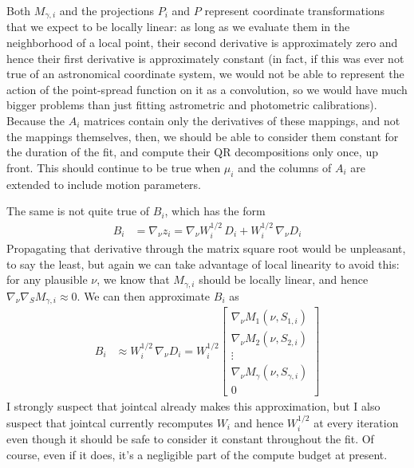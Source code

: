 Both $M_{\gamma,i}$ and the projections $P_i$ and $P$ represent coordinate transformations that we expect to be locally linear: as long as we evaluate them in the neighborhood of a local point, their second derivative is approximately zero and hence their first derivative is approximately constant (in fact, if this was ever not true of an astronomical coordinate system, we would not be able to represent the action of the point-spread function on it as a convolution, so we would have much bigger problems than just fitting astrometric and photometric calibrations).
Because the $A_i$ matrices contain only the derivatives of these mappings, and not the mappings themselves, then, we should be able to consider them constant for the duration of the fit, and compute their QR decompositions only once, up front.
This should continue to be true when $\mu_i$ and the columns of $A_i$ are extended to include motion parameters.

The same is not quite true of $B_i$, which has the form
\begin{align}
    B_i &= \nabla\!_{\nu} z_i
        = \nabla\!_{\nu} W_i^{1/2} \, D_i + W_i^{1/2} \, \nabla\!_{\nu} D_i
\end{align}
Propagating that derivative through the matrix square root would be unpleasant, to say the least, but again we can take advantage of local linearity to avoid this: for any plausible $\nu$, we know that $M_{\gamma,i}$ should be locally linear, and hence $\nabla\!_{\nu}\nabla\!_S M_{\gamma, i} \approx 0$.
We can then approximate $B_i$ as
\begin{align}
    B_i &\approx W_i^{1/2} \, \nabla\!_{\nu} D_i
        = W_i^{1/2}\left[
            \begin{array}{ c }
                \nabla\!_{\nu} M_1\left(\nu, S_{1,i}\right) \\
                \nabla\!_{\nu} M_2\left(\nu, S_{2,i}\right) \\
                \vdots \\
                \nabla\!_{\nu} M_{\gamma}\left(\nu, S_{\gamma,i}\right) \\
                0
            \end{array}
        \right]
\end{align}
I strongly suspect that jointcal already makes this approximation, but I also suspect that jointcal currently recomputes $W_i$ and hence $W_i^{1/2}$ at every iteration even though it should be safe to consider it constant throughout the fit.
Of course, even if it does, it's a negligible part of the compute budget at present.


